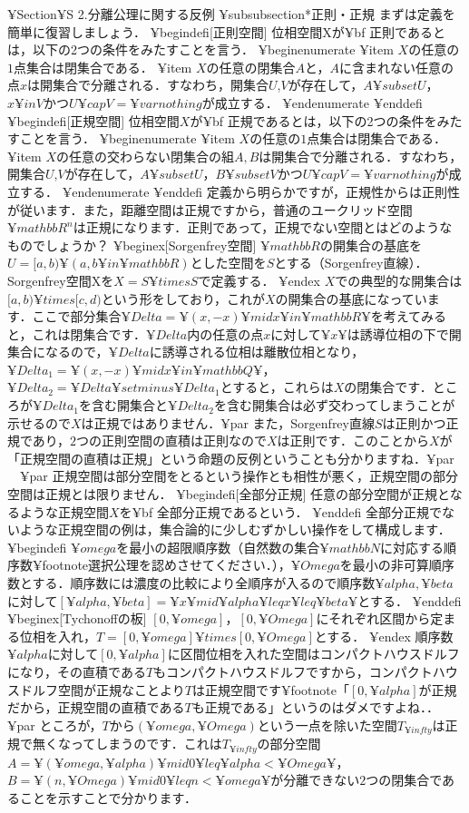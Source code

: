 ¥Section{¥S 2.分離公理に関する反例}
¥subsubsection*{正則・正規}
まずは定義を簡単に復習しましょう．
¥begin{defi}[正則空間]
位相空間Xが{¥bf 正則}であるとは，以下の2つの条件をみたすことを言う．
¥begin{enumerate}
¥item $X$の任意の$1$点集合は閉集合である．
¥item $X$の任意の閉集合$A$と，$A$に含まれない任意の点$x$は開集合で分離される．すなわち，開集合$U$,$V$が存在して，$A¥subset U$，$x¥in V$かつ$U¥cap V=¥varnothing$が成立する．
¥end{enumerate}
¥end{defi}
¥begin{defi}[正規空間]
位相空間$X$が{¥bf 正規}であるとは，以下の2つの条件をみたすことを言う．
¥begin{enumerate}
¥item $X$の任意の$1$点集合は閉集合である．
¥item $X$の任意の交わらない閉集合の組$A,B$は開集合で分離される．すなわち，開集合$U$,$V$が存在して，$A¥subset U$，$B¥subset V$かつ$U¥cap V=¥varnothing$が成立する．
¥end{enumerate}
¥end{defi}
定義から明らかですが，正規性からは正則性が従います．また，距離空間は正規ですから，普通のユークリッド空間$¥mathbb{R}^n$は正規になります．正則であって，正規でない空間とはどのようなものでしょうか？
¥begin{ex}[Sorgenfrey空間]
$¥mathbb{R}$の開集合の基底を$U=[a,b)¥ (a,b¥in¥mathbb{R})$とした空間を$S$とする（Sorgenfrey直線）．Sorgenfrey空間Xを$X=S¥times S$で定義する．
¥end{ex}
$X$での典型的な開集合は$[a,b)¥times[c,d)$という形をしており，これが$X$の開集合の基底になっています．ここで部分集合$¥Delta=¥{(x,-x)¥mid x¥in¥mathbb{R}¥}$を考えてみると，これは閉集合です．$¥Delta$内の任意の点$x$に対して$¥{ x ¥}$は誘導位相の下で開集合になるので，$¥Delta$に誘導される位相は離散位相となり，$¥Delta_1=¥{(x,-x)¥mid x¥in¥mathbb{Q}¥}$，$¥Delta_2=¥Delta¥setminus¥Delta_1$とすると，これらは$X$の閉集合です．ところが$¥Delta_1$を含む開集合と$¥Delta_2$を含む開集合は必ず交わってしまうことが示せるので$X$は正規ではありません．¥par
また，Sorgenfrey直線$S$は正則かつ正規であり，$2$つの正則空間の直積は正則なので$X$は正則です．このことから$X$が「正規空間の直積は正規」という命題の反例ということも分かりますね．¥par
　¥par
正規空間は部分空間をとるという操作とも相性が悪く，正規空間の部分空間は正規とは限りません．
¥begin{defi}[全部分正規]
任意の部分空間が正規となるような正規空間$X$を{¥bf 全部分正規}であるという．
¥end{defi}
全部分正規でないような正規空間の例は，集合論的に少しむずかしい操作をして構成します．
¥begin{defi}
$¥omega$を最小の超限順序数（自然数の集合$¥mathbb{N}$に対応する順序数¥footnote{選択公理を認めさせてください．}），$¥Omega$を最小の非可算順序数とする．順序数には濃度の比較により全順序が入るので順序数$¥alpha,¥beta$に対して$[¥alpha,¥beta]=¥{x¥mid ¥alpha¥leq x¥leq ¥beta¥}$とする．
¥end{defi}
¥begin{ex}[Tychonoffの板]
$[0,¥omega]$，$[0,¥Omega]$にそれぞれ区間から定まる位相を入れ，$T=[0,¥omega]¥times[0,¥Omega]$とする．
¥end{ex}
順序数$¥alpha$に対して$[0,¥alpha]$に区間位相を入れた空間はコンパクトハウスドルフになり，その直積である$T$もコンパクトハウスドルフですから，コンパクトハウスドルフ空間が正規なことより$T$は正規空間です¥footnote{「$[0,¥alpha]$が正規だから，正規空間の直積である$T$も正規である」というのはダメですよね．}．¥par
ところが，$T$から$(¥omega,¥Omega)$という一点を除いた空間$T_{¥infty}$は正規で無くなってしまうのです．これは$T_{¥infty}$の部分空間$A=¥{(¥omega,¥alpha)¥mid 0¥leq ¥alpha<¥Omega¥}$，$B=¥{ (n,¥Omega)¥mid 0¥leq n<¥omega ¥}$が分離できない$2$つの閉集合であることを示すことで分かります．

